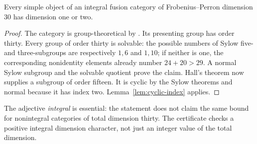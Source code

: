 \begin{proposition}\label{prop:dimension30}
Every simple object of an integral fusion category of Frobenius--Perron
dimension $30$ has dimension one or two.
\end{proposition}
\begin{proof}
The category is group-theoretical by
\cite[Theorem~9.2]{ENOWGT}. Its presenting group has order thirty.
Every group of order thirty is solvable: the possible numbers of Sylow
five- and three-subgroups are respectively $1,6$ and $1,10$; if neither
is one, the corresponding nonidentity elements already number $24+20>29$.
A normal Sylow subgroup and the solvable quotient prove the claim.
Hall's theorem now supplies a subgroup of order fifteen. It is cyclic
by the Sylow theorems and normal because it has index two.
Lemma~\ref{lem:cyclic-index} applies.
\end{proof}
The adjective \emph{integral} is essential: the statement does not claim
the same bound for nonintegral categories of total dimension thirty.
The certificate checks a positive integral dimension character, not just
an integer value of the total dimension.

